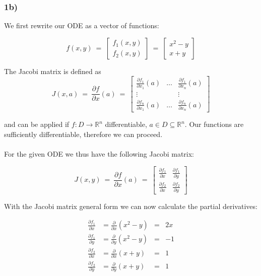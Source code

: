 \documentclass[]{scrartcl}
\begin{document}

\subsubsection*{1b)}

We first rewrite our ODE as a vector of functions:

\[
f(x,y) ~=~ \left[ \begin{array}{c} f_1(x,y) \\ f_2(x,y) \end{array} \right] ~=~ \left[ \begin{array}{c} x^2 - y \\ x + y \end{array} \right]
\]

The Jacobi matrix is defined as 
\[
J(x,a) ~=~ \frac{\partial f}{\partial x}(a) ~=~
\begin{bmatrix}
  \frac{\partial f_1}{\partial x_1}(a) &  \dots & \frac{\partial f_1}{\partial x_n}(a) \\[1ex] %
  								\vdots &		& \vdots \\[1ex]
  \frac{\partial f_n}{\partial x_1}(a) &  \dots & \frac{\partial f_n}{\partial x_n}(a)
\end{bmatrix}
\]

and can be applied if $f: D \rightarrow \mathbb{R}^n$ differentiable, $a \in D \subseteq \mathbb{R}^n$. Our functions are sufficiently differentiable, therefore we can proceed.
\\ \\
For the given ODE we thus have the following Jacobi matrix:

\[
J(x,y) ~=~ \frac{\partial f}{\partial x}(a) ~=~
\begin{bmatrix}
  \frac{\partial f_1}{\partial x} & \frac{\partial f_1}{\partial y} \\[1ex] %
  \frac{\partial f_2}{\partial x} & \frac{\partial f_2}{\partial y}
\end{bmatrix}
\]

With the Jacobi matrix general form we can now calculate the partial derivatives:

\begin{center}
\begin{align*}
	\frac{\partial f_1}{\partial x} &= \frac{\partial}{\partial x}(x^2 - y) &= & 2x \\
	\frac{\partial f_1}{\partial y} &= \frac{\partial}{\partial y}(x^2 - y) &= & -1 \\
	\frac{\partial f_2}{\partial x} &= \frac{\partial}{\partial x}(x + y)	&= & 1 \\
	\frac{\partial f_2}{\partial y} &= \frac{\partial}{\partial y}(x + y)	&= & 1 \\
\end{align*}
\end{center}
\end{document}
